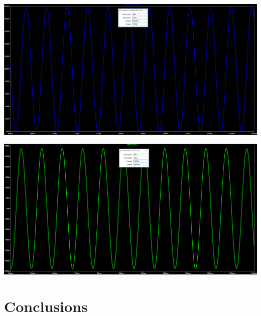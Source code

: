 \documentclass[journal]{IEEEtran}
\begin{document}
\begingroup
    \centering
    \medskip
    \includegraphics[width=\columnwidth]{images/Lab_9_ss_16.PNG}
    \label{fig:circ3}
    \medskip
\endgroup



\begingroup
    \centering
    \medskip
    \includegraphics[width=\columnwidth]{images/Lab_9_ss_17.PNG}
    \label{fig:circ3}
    \medskip
\endgroup










\section{Conclusions}


\printbibliography
\end{document}
